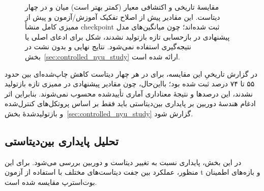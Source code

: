 \begin{figure}[htbp]
    \centering
    \caption[مقایسهٔ تاریخی بین‌دیتاستی معیار ]{مقایسهٔ تاریخی و
    اکتشافی معیار  (کمتر بهتر است) میان \basemodel{} و \proposedmodel{}
    در چهار دیتاست. این مقادیر پیش از اصلاح تفکیک آموزش/آزمون  و پیش
    از ممیزی کامل منشأ checkpoint ثبت شده‌اند؛ چون میانگین‌های مدل پیشنهادی در
    بازحسابی تازه بازتولید نشدند، شکل برای ادعای اصلی یا نتیجه‌گیری استفاده
    نمی‌شود. نتایج نهایی و بدون نشت در بخش~\ref{sec:controlled_nyu_study}
    ارائه شده است.}
    \label{fig:cross_dataset_silog}
\end{figure}

در گزارش تاریخیِ این مقایسه، برای \proposedmodel{} در هر چهار دیتاست کاهش
چاپ‌شده‌ای بین حدود ۵۵ تا ۷۴ درصد ثبت شده بود؛ بااین‌حال، چون مقادیر پیشنهادی
در ممیزی تازه بازتولید نشدند، این درصدها و نتیجهٔ معناداری آماری تأییدشده
محسوب نمی‌شوند. بنابراین اثر ادغام هندسهٔ دوربین بر پایداری بین‌دیتاستی باید
فقط بر اساس پروتکل‌های کنترل‌شده و بازتولیدشدهٔ بخش~\ref{sec:controlled_nyu_study}
گزارش شود.

\subsection{تحلیل پایداری بین‌دیتاستی \proposedmodel{}}
\label{subsec:revised_cross_dataset}

در این بخش، پایداری \proposedmodel{}
نسبت به تغییر دیتاست و دوربین بررسی می‌شود.
برای این منظور، عملکرد \proposedmodel{}
بین جفت دیتاست‌های مختلف
با استفاده از آزمون t
و بازه‌های اطمینان بوت‌استرپ
مقایسه شده است.

